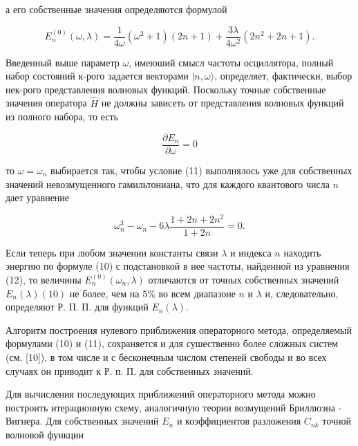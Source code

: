 \documentclass[10pt]{article}
\begin{document}
а его собственные значения определяются формулой



\[

E_{n}^{(0)}(\omega, \lambda)=\frac{1}{4 \omega}\left(\omega^{2}+1\right)(2 n+1)+\frac{3 \lambda}{4 \omega^{2}}\left(2 n^{2}+2 n+1\right) .

\]



Введенный выше параметр $\omega$, имеюший смысл частоты осциллятора, полный набор состояний к-рого задается векторами $|n, \omega\rangle$, определяет, фактически, выбор нек-рого представления волновых функций. Поскольку точные собственные значения оператора $\hat{H}$ не должны зависеть от представления волновых функций из полного набора, то есть



\[

\frac{\partial E_{n}}{\partial \omega}=0

\]



то $\omega=\omega_{n}$ выбирается так, чтобы условие (11) выполнялось уже для собственных значений невозмущенного гамильтониана, что для каждого квантового числа $n$ дает уравнение



\[

\omega_{n}^{3}-\omega_{n}-6 \lambda \frac{1+2 n+2 n^{2}}{1+2 n}=0 .

\]



Если теперь при любом значении константы связи $\lambda$ и индекса $n$ находить энергию по формуле (10) с подстановкой в нее частоты, найденной из уравнения (12), то величины $E_{n}^{(0)}\left(\omega_{n}, \lambda\right)$ отличаются от точных собственных значений $E_{n}(\lambda)(10)$ не более, чем на $5 \%$ во всем диапазоне $n$ и $\lambda$ и, следовательно, определяют Р. П. П. для функций $E_{n}(\lambda)$.



Алгоритм построения нулевого приближения операторного метода, определяемый формулами (10) и (11), сохраняется и для сушественно более сложных систем (см. [10]), в том числе и с бесконечным числом степеней свободы и во всех случаях он приводит к Р. п. П. для собственных значений.



Для вычисления последующих приближений операторного метода можно построить итерационную схему, аналогичную теории возмущений Бриллюэна - Вигнера. Для собственных значений $E_{n}$ и коэффициентов разложения $C_{n k}$ точной волновой функции
\end{document}
